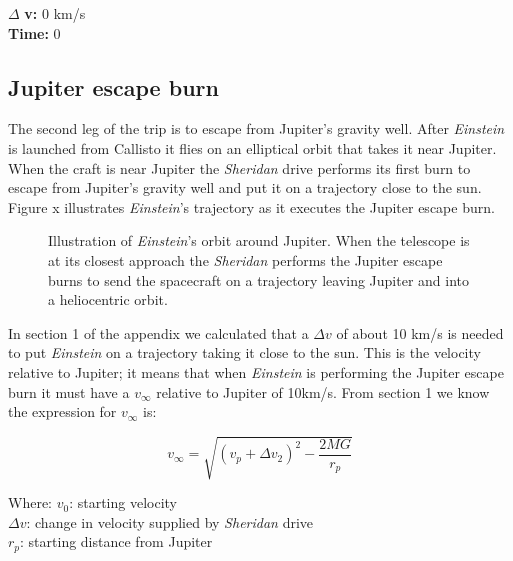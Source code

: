 \documentclass[12pt]{article} %
\begin{document}
$\Delta$ \textbf{v:} 0 km/s\\
\textbf{Time:} 0

\subsection{Jupiter escape burn}
The second leg of the trip is to escape from Jupiter's gravity well. After \textit{Einstein} is launched from Callisto it flies on an elliptical orbit that takes it near Jupiter. When the craft is near Jupiter the \textit{Sheridan} drive performs its first burn to escape from Jupiter's gravity well and put it on a trajectory close to the sun. Figure x illustrates \textit{Einstein}'s trajectory as it executes the Jupiter escape burn.

\begin{figure}[H]
	\caption{Illustration of \textit{Einstein}'s orbit around Jupiter. When the telescope is at its closest approach the \textit{Sheridan} performs the Jupiter escape burns to send the spacecraft on a trajectory leaving Jupiter and into a heliocentric orbit.}
\end{figure}

In section 1 of the appendix we calculated that a $\Delta v$ of about 10 km/s is needed to put \textit{Einstein} on a trajectory taking it close to the sun. This is the velocity relative to Jupiter; it means that when \textit{Einstein} is performing the Jupiter escape burn it must have a $v_{\infty}$ relative to Jupiter of 10km/s. From section 1 we know the expression for $v_{\infty}$ is:

$$v_{\infty} = \sqrt{(v_p + \Delta v_2)^2-\frac{2MG}{r_p}}$$

Where:
$v_0$: starting velocity\\
$\Delta v$: change in velocity supplied by \textit{Sheridan} drive\\
$r_p$: starting distance from Jupiter
\end{document}
